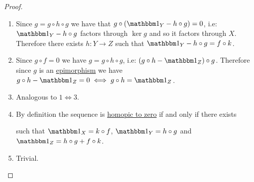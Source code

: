 \documentclass[../../main]{subfiles}
\begin{document}
\begin{proof}~
  \begin{enumerate}
    \item[\(1 \implies 3\)] Since \(g = g \circ h \circ g\) we have that \(g \circ (\id_{Y} - h \circ g) = 0\), i.e: \(\id_{Y} - h \circ g\) factors through \(\ker g\) and so it factors through \(X\).
          Therefore there exists \(h\colon Y \to Z\) such that \(\id_{Y} - h \circ g = f \circ k\).
    \item[\(3 \implies 1\)] Since \(g \circ f = 0\) we have \(g = g \circ h \circ g\), i.e: \((g \circ h - \id_{Z}) \circ g\).
          Therefore since \(g\) is an \hyperref[def:mono-epi-morphism]{epimorphism} we have \(g \circ h - \id_{Z} = 0 \iff g \circ h = \id_{Z}\).
    \item[\(2 \iff 3\)] Analogous to \(1 \iff 3\).
    \item[\(3 \iff 4\)] By definition the sequence is \hyperref[def:homotopy]{homopic to zero} if and only if there exists
          \begin{center}
          \end{center}
          such that \(\id_{X} = k \circ f\), \(\id_{Y} = h \circ g\) and \(\id_{Z} = h \circ g + f \circ k\).
    \item[\(3 \iff 5\)] Trivial. \qedhere
  \end{enumerate}
\end{proof}
\end{document}
